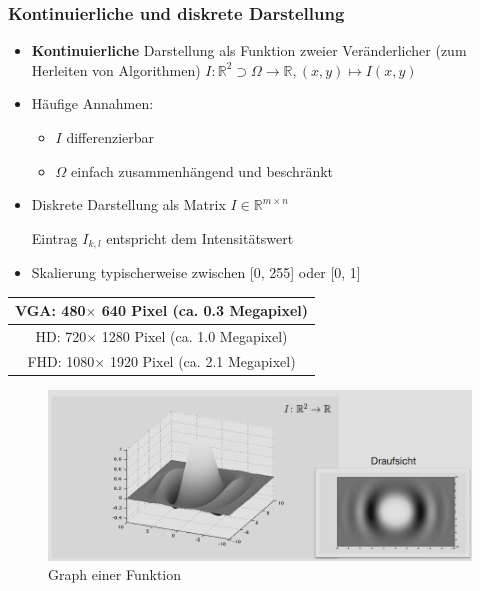 \documentclass[12pt, a4paper, oneside]{article}
\begin{document}
\subsubsection*{Kontinuierliche und diskrete Darstellung}
\begin{itemize}
    \item \textbf{Kontinuierliche} Darstellung als Funktion zweier Veränderlicher (zum Herleiten von Algorithmen) 
    $I: \mathbb{R}^2\supset\Omega\to\mathbb{R}, (x,y)\mapsto I(x,y)$
    \item Häufige Annahmen:
    \begin{itemize}
        \item $I$ differenzierbar
        \item $\Omega$ einfach zusammenhängend und beschränkt
    \end{itemize}
    \item Diskrete Darstellung als Matrix $I\in \mathbb R^{m\times n}$
    
    Eintrag $I_{k,l}$ entspricht dem Intensitätswert
    \item Skalierung typischerweise zwischen [0, 255] oder [0, 1]
\end{itemize}

\begin{table}[h]
\centering
\begin{tabular}{|c|}
\hline
VGA: 480$\times$ 640  Pixel (ca. 0.3 Megapixel) \\
\hline
HD: 720$\times$ 1280  Pixel (ca. 1.0 Megapixel) \\
\hline
FHD:  1080$\times$ 1920  Pixel (ca. 2.1 Megapixel) \\
\hline
\end{tabular}
\label{tab:table_label}
\end{table}

\begin{figure}[htbp]
    \centering
    \includegraphics[scale=0.7]{../img/1-2.png}
    \caption{Graph einer Funktion}
    \label{img/1-2}
\end{figure}
\end{document}
